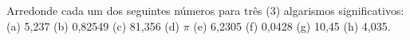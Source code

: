 Arredonde cada um dos seguintes números para três (3) algarismos significativos: (a) 5,237 (b) 0,82549 (c) 81,356 (d) $\pi$ (e) 6,2305 (f) 0,0428 (g) 10,45 (h) 4,035.


